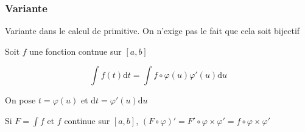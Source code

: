 \documentclass[french]{yLectureNote}
\begin{document}
\subsubsection{Variante}
Variante dans le calcul de primitive. On n'exige pas le fait que cela soit bijectif

Soit $f$ une fonction contnue sur $[a,b]$

\[\int f(t)\mathrm{d}t = \int f\circ \varphi (u) \varphi'(u)\mathrm{d}u\]

On pose $t = \varphi(u)$ et $\mathrm{d}t = \varphi'(u)\mathrm{d}u$

Si $F = \int f$ et $f$ continue sur $[a,b]$, $(F\circ \varphi)' = F'\circ \varphi \times \varphi' = f\circ \varphi \times \varphi'$
\end{document}
